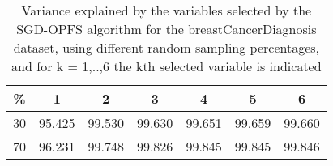 \begin{table}
	\begin{center}
		\begin{tabular}{c c c c c c c}
			\% & 1 & 2 & 3 & 4 & 5 & 6 \\
			\hline
			30 & 95.425 & 99.530 & 99.630 & 99.651 & 99.659 & 99.660 \\
			70 & 96.231 & 99.748 & 99.826 & 99.845 & 99.845 & 99.846 \\
		\end{tabular}
	\end{center}
	\caption{Variance explained by the variables selected by the SGD-OPFS algorithm for the breastCancerDiagnosis dataset, using different random sampling percentages, and for k = 1,..,6 the kth selected variable is indicated}
\end{table}